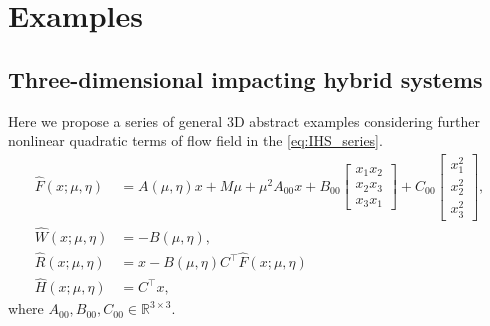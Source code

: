 
\section{Examples}

\subsection{Three-dimensional impacting hybrid systems}\label{sec:3d-case-analysis}
Here we propose a series of general 3D abstract examples considering further nonlinear quadratic terms of flow field in the \eqref{eq:IHS_series}. 
\begin{equation}
	\begin{split}
		\hat{F}(x;\mu,\eta) &= A(\mu, \eta) x + M \mu + \mu^2 A_{00} x + 
		B_{00}\begin{bmatrix}
			x_1 x_2 \\
			x_2 x_3 \\
			x_3 x_1
		\end{bmatrix}
		+
		C_{00}\begin{bmatrix}
			x_1^2 \\
			x_2^2 \\
			x_3^2
		\end{bmatrix},
		\\
		\hat{W}(x;\mu,\eta) &= -B(\mu, \eta), \\
		\hat{R}(x;\mu,\eta) &= x - {B}(\mu,\eta) {C}^{\top} \hat{F}(x;\mu,\eta) \\
		\hat{H}(x;\mu,\eta) &= C^{\top} x,
	\end{split}
	\label{eq:codim2_NL_Nform}
\end{equation}
where $A_{00}, B_{00}, C_{00} \in \mathbb{R}^{3\times3}$.

